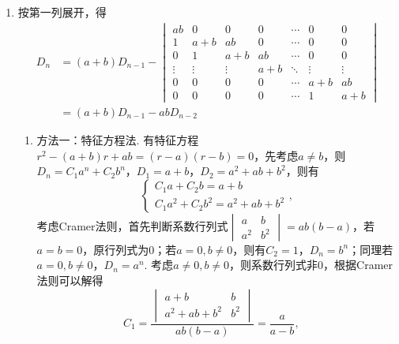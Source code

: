 \begin{enumerate}
    \item 按第一列展开，得
          \begin{align*}
              D_{n} & =(a+b) D_{n-1}-\begin{vmatrix}
                                         a b    & 0      & 0      & 0   & \cdots & 0      & 0      \\
                                         1      & a+b    & a b    & 0   & \cdots & 0      & 0      \\
                                         0      & 1      & a+b    & a b & \cdots & 0      & 0      \\
                                         \vdots & \vdots & \vdots & a+b & \ddots & \vdots & \vdots \\
                                         0      & 0      & 0      & 0   & \cdots & a+b    & a b    \\
                                         0      & 0      & 0      & 0   & \cdots & 1      & a+b
                                     \end{vmatrix} \\
                    & =(a+b) D_{n-1}-a b D_{n-2}
          \end{align*}
          \begin{enumerate}
              \item 方法一：特征方程法. 有特征方程$r^2-(a+b)r+ab=(r-a)(r-b)=0$，先考虑$a\neq b$，则$D_n=C_1a^n+C_2b^n$，$D_{1}=a+b$，$D_{2}=a^{2}+a b+b^{2}$，则有
                    \[\begin{cases}
                            C_1a+C_2b=a+b \\
                            C_1a^2+C_2b^2=a^2+ab+b^2
                        \end{cases},\]
                    考虑Cramer法则，首先判断系数行列式$\begin{vmatrix}
                            a   & b   \\
                            a^2 & b^2
                        \end{vmatrix}=ab(b-a)$，若$a=b=0$，原行列式为0；若$a=0,b\neq 0$，则有$C_2=1$，$D_n=b^n$；同理若$a=0,b\neq 0$，$D_n=a^n$. 考虑$a\neq 0,b\neq 0$，则系数行列式非0，根据Cramer法则可以解得
                    \[C_1=\frac{\begin{vmatrix}
                                a+b        & b   \\
                                a^2+ab+b^2 & b^2
                            \end{vmatrix}}{ab(b-a)}=\frac{a}{a-b},\quad
\]
\end{enumerate}
\end{enumerate}
